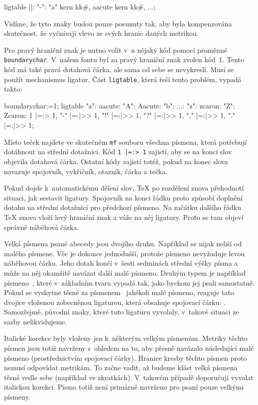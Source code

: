 \begtt
ligtable  ||: "-":
      "a" kern kk#,  aacute kern kk#,
      ...;
\endtt

Vidíme, že tyto znaky budou pouze posunuty tak, aby byla kompenzována
skutečnost, že vyčnívají vlevo ze svých hranic daných metrikou.

Pro pravý hraniční znak je nutno volit v~\mf{}u nějaký kód pomocí proměnné
{\tt boundarychar}. V~našem fontu byl za pravý hraniční znak zvolen kód~1.
Tento kód má také pravá dotahová čárka, ale sama od sebe se
nevykreslí. Musí se použít mechanismus ligatur. Část {\tt ligtable}, která
řeší tento problém, vypadá takto:

\begtt
boundarychar:=1;
ligtable "a": aacute: "A": Aacute:  "b":
   ...:
   "z": zcaron: "Z": Zcaron:
      1 |=:> 1, "-" |=:|>> 1, "!" |=:|>> 1,
      "?" |=:|>> 1,  "," |=:|>> 1,  "." |=:|>> 1;
\endtt

Místo teček najdete ve skutečném {\tt mf} souboru všechna
písmena, která potřebují dotáhnout na střední dotažnici. Kód
{\tt 1 |=:> 1} zajistí, aby se na konci slov objevila dotahová čárka.
Ostatní kódy zajistí totéž, pokud na konec slova navazuje spojovník,
vykřičník, otazník, čárka a tečka.

Pokud dojde k~automatickému dělení slov, \TeX{} po rozdělení znova
přehodnotí situaci, jak sestavit ligatury. Spojovník na konci řádku proto
způsobí doplnění dotahu na střední dotažnici pro předchozí písmeno. Na
začátku dalšího řádku \TeX{} znova vloží levý hraniční znak a váže na něj
ligatury. Proto se tam objeví správně náběhová čárka.

Velká písmena psané abecedy jsou dvojího druhu. Například  se nijak
neliší od malého písmene. Věc je dokonce jednodušší, protože písmeno
nevyžaduje levou náběhovou čárku. Jeho dotah končí v~šesti sedminách
střední výšky písma a může na něj okamžitě navázat další malé písmeno.
Druhým typem je například písmeno~, které v~základním tvaru vypadá tak,
jako bychom jej psali samostatně. Pokud se vyskytne těsně za
písmenem~ jakékoli malé písmeno, reaguje tato dvojice vloženou
zobecněnou ligaturou, která obsahuje spojovací čárku:
. Samozřejmě, původní znaky, které tuto
ligaturu vyvolaly, v~takové situaci ze sazby nelikvidujeme.

Italické korekce byly vloženy jen k~některým velkým písmenům. Metriky těchto
písmen jsou totiž navrženy s~ohledem na to, aby přesně navázalo následující
malé písmeno (prostřednictvím spojovací čárky). Hranice kresby těchto písmen
proto nemusí odpovídat metrikám. To začne vadit, až budeme klást velká písmena
těsně vedle sebe (například ve zkratkách). V~takovém případě doporučuji
vyvolat italickou korekci. Písmo totiž není primárně navrženo pro psaní
pouze velkými písmeny.

